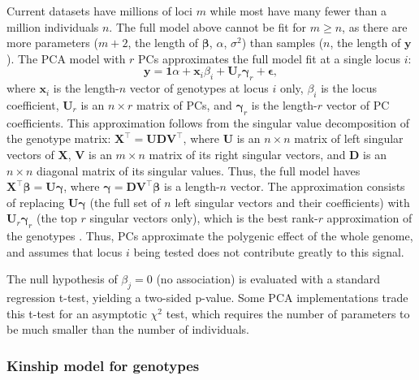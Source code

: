 \documentclass[11pt]{article}
\begin{document}
Current datasets have millions of loci $m$ while most have many fewer than a million individuals $n$.
The full model above cannot be fit for $m \ge n$, as there are more parameters ($m+2$, the length of $\boldsymbol{\beta}$, $\alpha$, $\sigma^2$) than samples ($n$, the length of $\mathbf{y}$).
The PCA model with $r$ PCs approximates the full model fit at a single locus $i$:
\begin{equation}
  \label{eq:pca_gwas}
  \mathbf{y}
  =
  \mathbf{1} \alpha + \mathbf{x}_i \beta_i + \mathbf{U}_r \boldsymbol{\gamma}_r + \boldsymbol{\epsilon}
  ,
\end{equation}
where $\mathbf{x}_i$ is the length-$n$ vector of genotypes at locus $i$ only,
$\beta_i$ is the locus coefficient,
$\mathbf{U}_r$ is an $n \times r$ matrix of PCs, and
$\boldsymbol{\gamma}_r$ is the length-$r$ vector of PC coefficients.
This approximation follows from the singular value decomposition of the genotype matrix:
$\mathbf{X}^\intercal = \mathbf{U} \mathbf{D} \mathbf{V}^\intercal$,
where
$\mathbf{U}$ is an $n \times n$ matrix of left singular vectors of $\mathbf{X}$,
$\mathbf{V}$ is an $m \times n$ matrix of its right singular vectors, and
$\mathbf{D}$ is an $n \times n$ diagonal matrix of its singular values.
Thus, the full model haves
$\mathbf{X}^\intercal \boldsymbol{\beta} = \mathbf{U} \boldsymbol{\gamma}$,
where
$\boldsymbol{\gamma} = \mathbf{D} \mathbf{V}^\intercal \boldsymbol{\beta}$ is a length-$n$ vector.
The approximation consists of replacing $\mathbf{U} \boldsymbol{\gamma}$ (the full set of $n$ left singular vectors and their coefficients) with $\mathbf{U}_r \boldsymbol{\gamma}_r$ (the top $r$ singular vectors only), which is the best rank-$r$ approximation of the genotypes \citep{jolliffe_principal_2002}. %
Thus, PCs approximate the polygenic effect of the whole genome, and assumes that locus $i$ being tested does not contribute greatly to this signal.

The null hypothesis of $\beta_j = 0$ (no association) is evaluated with a standard regression t-test, yielding a two-sided p-value.
Some PCA implementations trade this t-test for an asymptotic $\chi^2$ test, which requires the number of parameters to be much smaller than the number of individuals.

\subsubsection{Kinship model for genotypes}
\end{document}
